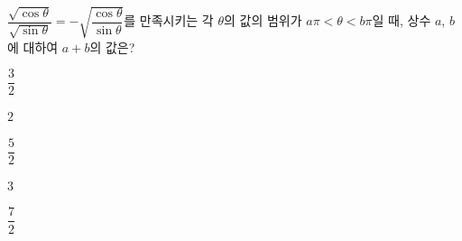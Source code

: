 $\dfrac{\sqrt{\cos\theta}}{\sqrt{\sin\theta}}=-\sqrt{\dfrac{\cos\theta}{\sin\theta}}$를 만족시키는 각 $\theta$의 값의 범위가 $a\pi<\theta<b\pi$일 때, 상수 $a$, $b$에 대하여 $a+b$의 값은? 
\begin{choices32}{\rule[-3ex]{0pt}{8ex}$\dfrac{3}{2}$}{\rule[-3ex]{0pt}{8ex}$2$}{\rule[-3ex]{0pt}{8ex}$\dfrac{5}{2}$}{\rule[-3ex]{0pt}{8ex}$3$}{\rule[-3ex]{0pt}{8ex}$\dfrac{7}{2}$}\end{choices32}
